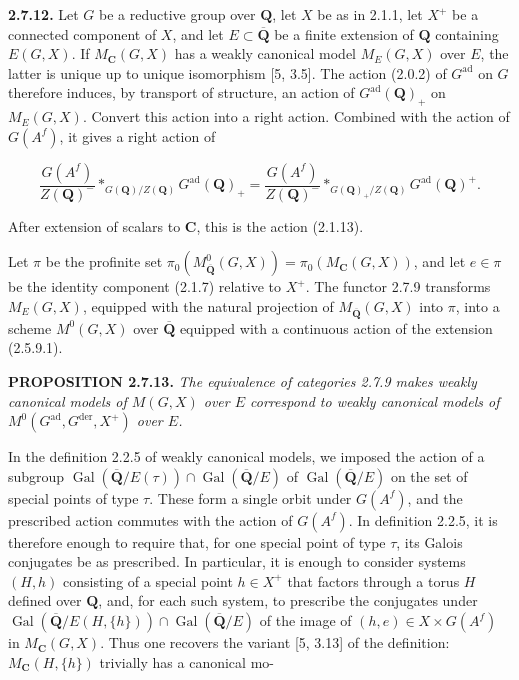 \documentclass[10pt,a4paper]{article}
\begin{document}
\textbf{2.7.12.} Let \(G\) be a reductive group over \(\mathbf Q\), let \(X\) be as in 2.1.1, let \(X^+\) be a connected component of \(X\), and let \(E\subset\overline{\mathbf Q}\) be a finite extension of \(\mathbf Q\) containing \(E(G,X)\). If \(M_{\mathbf C}(G,X)\) has a weakly canonical model \(M_E(G,X)\) over \(E\), the latter is unique up to unique isomorphism {[}5, 3.5{]}. The action (2.0.2) of \(G^{\mathrm{ad}}\) on \(G\) therefore induces, by transport of structure, an action of \(G^{\mathrm{ad}}(\mathbf Q)_+\) on \(M_E(G,X)\). Convert this action into a right action. Combined with the action of \(G(A^f)\), it gives a right action of

\[
\frac{G(A^f)}{Z(\mathbf Q)^{-}}*_{G(\mathbf Q)/Z(\mathbf Q)}G^{\mathrm{ad}}(\mathbf Q)_+
=
\frac{G(A^f)}{Z(\mathbf Q)^{-}}*_{G(\mathbf Q)_+/Z(\mathbf Q)}G^{\mathrm{ad}}(\mathbf Q)^+.
\]

After extension of scalars to \(\mathbf C\), this is the action (2.1.13).

Let \(\pi\) be the profinite set \(\pi_0(M^0_{\overline{\mathbf Q}}(G,X))=\pi_0(M_{\mathbf C}(G,X))\), and let \(e\in\pi\) be the identity component (2.1.7) relative to \(X^+\). The functor 2.7.9 transforms \(M_E(G,X)\), equipped with the natural projection of \(M_{\overline{\mathbf Q}}(G,X)\) into \(\pi\), into a scheme \(M^0(G,X)\) over \(\overline{\mathbf Q}\) equipped with a continuous action of the extension (2.5.9.1).

\textbf{PROPOSITION 2.7.13.} \emph{The equivalence of categories 2.7.9 makes weakly canonical models of \(M(G,X)\) over \(E\) correspond to weakly canonical models of \(M^0(G^{\mathrm{ad}},G^{\mathrm{der}},X^+)\) over \(E\).}

In the definition 2.2.5 of weakly canonical models, we imposed the action of a subgroup \(\operatorname{Gal}(\overline{\mathbf Q}/E(\tau))\cap\operatorname{Gal}(\overline{\mathbf Q}/E)\) of \(\operatorname{Gal}(\overline{\mathbf Q}/E)\) on the set of special points of type \(\tau\). These form a single orbit under \(G(A^f)\), and the prescribed action commutes with the action of \(G(A^f)\). In definition 2.2.5, it is therefore enough to require that, for one special point of type \(\tau\), its Galois conjugates be as prescribed. In particular, it is enough to consider systems \((H,h)\) consisting of a special point \(h\in X^+\) that factors through a torus \(H\) defined over \(\mathbf Q\), and, for each such system, to prescribe the conjugates under \(\operatorname{Gal}(\overline{\mathbf Q}/E(H,\{h\}))\cap\operatorname{Gal}(\overline{\mathbf Q}/E)\) of the image of \((h,e)\in X\times G(A^f)\) in \(M_{\mathbf C}(G,X)\). Thus one recovers the variant {[}5, 3.13{]} of the definition: \(M_{\mathbf C}(H,\{h\})\) trivially has a canonical mo-
\end{document}
